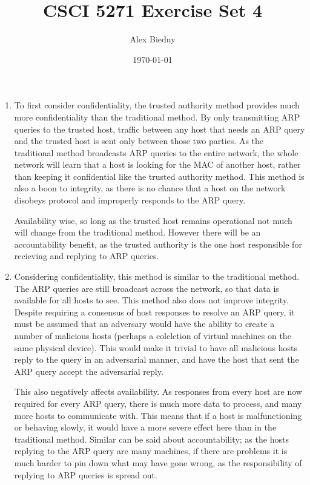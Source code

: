 \documentclass{jhwhw}
\title{CSCI 5271 Exercise Set 4}
\author{Alex Biedny}
\date{\today}
\begin{document}
\maketitle

\begin{enumerate}
\item To first consider confidentiality, the trusted authority method provides much more confidentiality than the traditional method. By only transmitting ARP queries to the trusted host, traffic between any host that needs an ARP query and the trusted host is sent only between those two parties. As the traditional method broadcasts ARP queries to the entire network, the whole network will learn that a host is looking for the MAC of another host, rather than keeping it confidential like the trusted authority method.
This method is also a boon to integrity, as there is no chance that a host on the network disobeys protocol and improperly responds to the ARP query.

Availability wise, so long as the trusted host remains operational not much will change from the traditional method. However there will be an accountability benefit, as the trusted authority is the one host responsible for recieving and replying to ARP queries. 
\item Considering confidentiality, this method is similar to the traditional method. The ARP queries are still broadcast across the network, so that data is available for all hosts to see. This method also does not improve integrity. Despite requiring a consensus of host responses to resolve an ARP query, it must be assumed that an adversary would have the ability to create a number of malicious hosts (perhaps a colelction of virtual machines on the same physical device). This would make it trivial to have all malicious hosts reply to the query in an adversarial manner, and have the host that sent the ARP query accept the adversarial reply.

This also negatively affects availability. As responses from every host are now required for every ARP query, there is much more data to process, and many more hosts to communicate with. This means that if a host is malfunctioning or behaving slowly, it would have a more severe effect here than in the traditional method. Similar can be said about accountability; as the hosts replying to the ARP query are many machines, if there are problems it is much harder to pin down what may have gone wrong, as the responsibility of replying to ARP queries is spread out. 
\end{enumerate}
\end{document}
